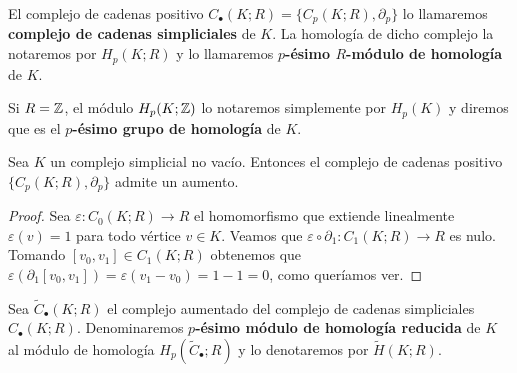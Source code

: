 \begin{definicion}
	El complejo de cadenas positivo $C_{\bullet}(K;R) = \{C_{p}(K;R), \partial_{p}\}$
	lo llamaremos \textbf{complejo de cadenas simpliciales} de $K$. La homología de
	dicho complejo la notaremos por $H_{p}(K;R)$ y lo llamaremos \textbf{$p$-ésimo
		$R$-módulo de homología} de $K$.
\end{definicion}
Si $R=\mathbb{Z}$, el módulo $H_{p}(K;\mathbb{Z})$ lo notaremos simplemente por $H_{p}(K)$ y diremos
que es el \textbf{$p$-ésimo grupo de homología} de $K$.

\begin{proposicion}
	\label{prop:aumento} Sea $K$ un complejo simplicial no vacío. Entonces el
	complejo de cadenas positivo $\{ C_{p}(K;R), \partial_{p}\}$ admite un aumento.
\end{proposicion}
\begin{proof}
	Sea $\varepsilon: C_{0}(K;R) \to R$ el homomorfismo que extiende linealmente $\varepsilon
	(v) = 1$ para todo vértice $v \in K$. Veamos que
	$\varepsilon \circ \partial_{1}: C_{1}(K;R) \to R$ es nulo. Tomando $[v_{0},v_{1}
	] \in C_{1}(K;R)$ obtenemos que $\varepsilon (\partial_{1}[v_{0},v_{1}]) = \varepsilon
	(v_{1}- v_{0}) = 1-1 = 0$, como queríamos ver.
\end{proof}

\begin{definicion}
	Sea $\widetilde{C}_{\bullet}(K;R)$ el complejo aumentado del complejo de cadenas
	simpliciales $C_{\bullet}(K;R)$. Denominaremos \textbf{$p$-ésimo módulo de
		homología reducida} de $K$ al módulo de homología $H_{p}(\widetilde{C}_{\bullet}
	;R)$ y lo denotaremos por $\widetilde{H}(K;R)$.
\end{definicion}

